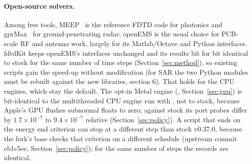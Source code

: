 \paragraph{Open-source solvers.} Among free tools, MEEP~\cite{meep} is the reference FDTD code for photonics and
gprMax~\cite{gprmax} for ground-penetrating radar; openEMS is the usual choice for PCB-scale RF and antenna work,
largely for its Matlab/Octave and Python interfaces. fdtdKit keeps openEMS's interfaces unchanged and its results bit
for bit identical to stock for the same number of time steps (Section~\ref{sec:method}), so existing scripts gain the
speed-up without modification (for SAR the two Python modules must be rebuilt against the new libraries,
 section 6). That holds for the CPU engines, which stay the default. The opt-in Metal engine
(, Section~\ref{sec:gpu}) is bit-identical to the multithreaded CPU engine run with
, not to stock, because Apple's GPU flushes subnormal floats to zero; against stock its port
probes differ by $1.7\times10^{-7}$ to
$9.4\times10^{-7}$ relative (Section~\ref{sec:policy}). A script that ends on the energy end criterion can stop at a
different step than stock v0.37.0, because the fork's base checks that criterion on a different schedule (upstream
commit eb1c5ee, Section~\ref{sec:policy}); for the same number of steps the records are identical.

